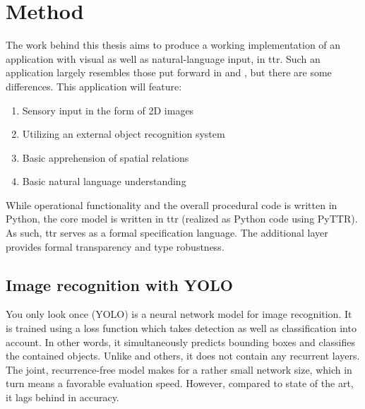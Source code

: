 \section{Method}
\label{sec:method}

The work behind this thesis aims to produce a working implementation of an application with visual as well as natural-language input, in \gls{ttr}.
Such an application largely resembles those put forward in \cite{lspc} and \cite{ttrspat}, but there are some differences.
This application will feature:

\begin{enumerate}
\item Sensory input in the form of 2D images
\item Utilizing an external object recognition system
\item Basic apprehension of spatial relations
\item Basic natural language understanding
\end{enumerate}

While operational functionality and the overall procedural code is written in Python, the core model is written in \gls{ttr} (realized as Python code using PyTTR).
As such, \gls{ttr} serves as a formal specification language.
The additional layer provides formal transparency and type robustness.



\subsection{Image recognition with YOLO}

You only look once (YOLO) \citep{RedmonYouOnlyLook2015} is a neural network model for image recognition.
It is trained using a loss function which takes detection as well as classification into account.
In other words, it simultaneously predicts bounding boxes and classifies the contained objects.
Unlike \cite{HeMaskRCNN2017} and others, it does not contain any recurrent layers.
The joint, recurrence-free model makes for a rather small network size, which in turn means a favorable evaluation speed.
However, compared to state of the art, it lags behind in accuracy.

